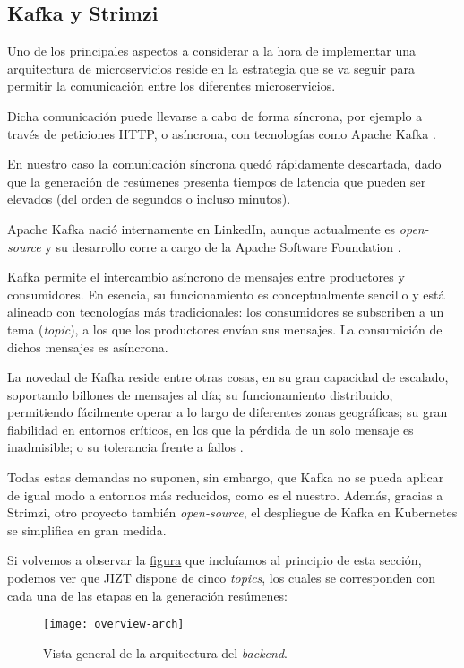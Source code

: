 \subsection{Kafka y Strimzi}

Uno de los principales aspectos a considerar a la hora de implementar una arquitectura de microservicios reside en la estrategia que se va seguir para permitir la comunicación entre los diferentes microservicios.

Dicha comunicación puede llevarse a cabo de forma síncrona, por ejemplo a través de peticiones HTTP, o asíncrona, con tecnologías como Apache Kafka \cite{microsoft-microsvcs}.

En nuestro caso la comunicación síncrona quedó rápidamente descartada, dado que la generación de resúmenes presenta tiempos de latencia que pueden ser elevados (del orden de segundos o incluso minutos).

Apache Kafka nació internamente en LinkedIn, aunque actualmente es \emph{open-source} y su desarrollo corre a cargo de la Apache Software Foundation \cite{wiki-kafka}.

Kafka permite el intercambio asíncrono de mensajes entre productores y consumidores. En esencia, su funcionamiento es conceptualmente sencillo y está alineado con tecnologías más tradicionales: los consumidores se subscriben a un tema (\emph{topic}), a los que los productores envían sus mensajes. La consumición de dichos mensajes es asíncrona.

La novedad de Kafka reside entre otras cosas, en su gran capacidad de escalado, soportando billones de mensajes al día; su funcionamiento distribuido, permitiendo fácilmente operar a lo largo de diferentes zonas geográficas; su gran fiabilidad en entornos críticos, en los que la pérdida de un solo mensaje es inadmisible; o su tolerancia frente a fallos \cite{apache-kafka}.

Todas estas demandas no suponen, sin embargo, que Kafka no se pueda aplicar de igual modo a entornos más reducidos, como es el nuestro. Además, gracias a Strimzi, otro proyecto también \emph{open-source}, el despliegue de Kafka en Kubernetes se simplifica en gran medida.

Si volvemos a observar la \hyperref[fig:overview-arch-2]{figura} que incluíamos al principio de esta sección, podemos ver que JIZT dispone de cinco \emph{topics}, los cuales se corresponden con cada una de las etapas en la generación resúmenes:

\begin{figure}[!h]
	\centering
	\texttt{[image: overview-arch]}
	\caption{Vista general de la arquitectura del \emph{backend}.}
	\label{fig:overview-arch-2}
\end{figure}


